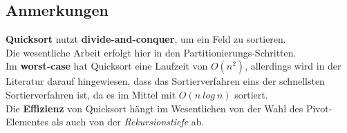 \subsection{Anmerkungen}
\textbf{Quicksort} nutzt \textbf{divide-and-conquer}, um ein Feld zu sortieren.\\
Die wesentliche Arbeit erfolgt hier in den Partitionierungs-Schritten.\\

\noindent
Im \textbf{worst-case} hat Quicksort eine Laufzeit von $O(n^2)$, allerdings wird in der Literatur darauf hingewiesen, dass das Sortierverfahren eins der schnellsten Sortierverfahren ist, da es im Mittel mit $O(n\ log\ n)$ sortiert.\\

\noindent
Die \textbf{Effizienz} von Quicksort hängt im Wesentlichen von der Wahl des Pivot-Elementes als auch von der \textit{Rekursionstiefe} ab.